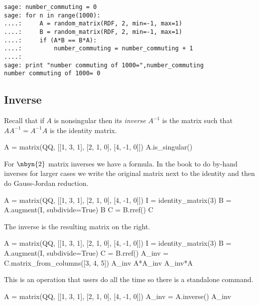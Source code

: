 \begin{lstlisting}
sage: number_commuting = 0 
sage: for n in range(1000):                                       
....:     A = random_matrix(RDF, 2, min=-1, max=1)
....:     B = random_matrix(RDF, 2, min=-1, max=1)
....:     if (A*B == B*A):
....:         number_commuting = number_commuting + 1 
....: 
sage: print "number commuting of 1000=",number_commuting
number commuting of 1000= 0  
\end{lstlisting}

 


\subsection{Inverse}
Recall that if $A$ is nonsingular then its \textit{inverse} $A^{-1}$
is the matrix such that $AA^{-1}=A^{-1}A$ is the identity matrix. 
\begin{sageoutput}
A = matrix(QQ, [[1, 3, 1], [2, 1, 0], [4, -1, 0]])
A.is_singular()
\end{sageoutput}
\noindent
For $\nbyn{2}$ matrix inverses we have a formula.
In the book to do by-hand inverses for larger cases 
we write the original matrix next to the identity 
and then do Gauss-Jordan reduction.
\begin{sageoutput}[d,0,1]
A = matrix(QQ, [[1, 3, 1], [2, 1, 0], [4, -1, 0]])
I = identity_matrix(3)
B = A.augment(I, subdivide=True)
B
C = B.rref()
C
\end{sageoutput}
\noindent
The inverse is the resulting matrix on the right.
\begin{sageoutput}[d,0,4]
A = matrix(QQ, [[1, 3, 1], [2, 1, 0], [4, -1, 0]])
I = identity_matrix(3)
B = A.augment(I, subdivide=True)
C = B.rref()
A_inv = C.matrix_from_columns([3, 4, 5])
A_inv
A*A_inv
A_inv*A
\end{sageoutput}

This is an operation that \Sage{} users do all the time so there is a
standalone command.
\begin{sageoutput}[d,0,1]
A = matrix(QQ, [[1, 3, 1], [2, 1, 0], [4, -1, 0]])
A_inv = A.inverse()
A_inv
\end{sageoutput}

